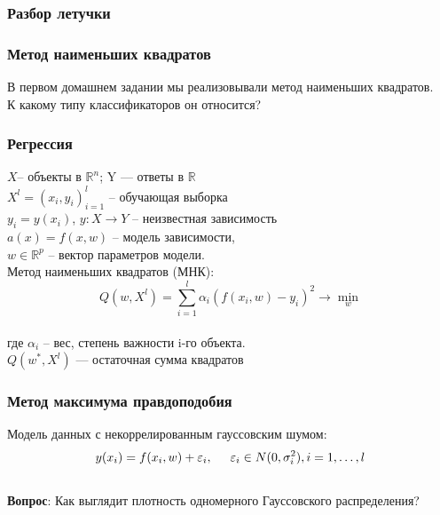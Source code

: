 \documentclass[12pt]{beamer}
\subtitle{Лекция 11. Линейная регрессия. PCA. AUC.}
\begin{document}
	
\frame{\titlepage}

\begin{frame}\frametitle{Разбор летучки}

\end{frame}

\begin{frame}\frametitle{Метод наименьших квадратов}
В первом домашнем задании мы реализовывали метод наименьших квадратов.\\
К какому типу классификаторов он относится?
\end{frame}

\begin{frame}\frametitle{Регрессия}
$X$-- объекты в $\mathbb{R}^n$; Y — ответы в $\mathbb{R}$\\
$X^l = (x_i, y_i)_{i=1}^l$ -- обучающая выборка\\
$y_i = y(x_i)$,  $y : X \rightarrow Y$ -- неизвестная зависимость\\
\vspace{5mm}
$a(x) = f (x, w)$ -- модель зависимости,\\
$w \in \mathbb{R}^p$ -- вектор параметров модели.\\
\vspace{5mm}
Метод наименьших квадратов (МНК):\\
$$Q(w,X^l) = \sum\limits_{i=1}^l \alpha_i (f (x_i, w) - y_i)^2 \rightarrow \min\limits_{w}$$\\
где $\alpha_i$ -- вес, степень важности i-го объекта.\\
$Q(w^*,X^l)$ — остаточная сумма квадратов

\end{frame}

\begin{frame}\frametitle{Метод максимума правдоподобия}
Модель данных с некоррелированным гауссовским шумом:\\
$$y(x_i) = f (x_i, w) + \varepsilon_i, \hspace{5mm} \varepsilon_i \in N (0, \sigma_i^2), i = 1, \dots, l$$\\
\vspace{5mm}
\textbf{Вопрос}: Как выглядит плотность одномерного Гауссовского распределения?
\end{frame}
\end{document}
